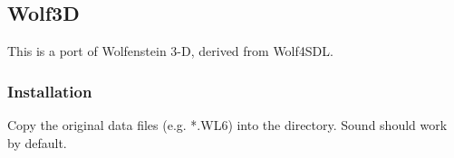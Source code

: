 \subsection{Wolf3D}

This is a port of Wolfenstein 3-D, derived from Wolf4SDL.

\subsubsection{Installation}
Copy the original data files (e.g. *.WL6) into the
 directory. Sound should work by default.
